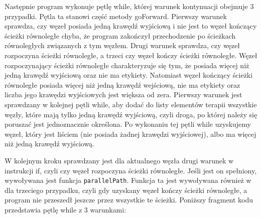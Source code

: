 Następnie program wykonuje pętlę while, której warunek kontynuacji obejmuje 3 przypadki. Pętla ta stanowi część metody goForward.
Pierwszy warunek sprawdza, czy węzeł posiada jedną krawędź wyjściową i nie jest to węzeł kończący ścieżki równoległe chyba, że program zakończył przechodzenie po ścieżkach równoległych związanych z tym węzłem. 
Drugi warunek sprawdza, czy węzeł rozpoczyna ścieżki równoległe, a trzeci czy węzeł kończy ścieżki równoległe. Węzeł rozpoczynający ścieżki równoległe charakteryzuje się tym, że posiada więcej niż jedną krawędź wyjściową oraz nie ma etykiety. Natomiast węzeł kończący ścieżki równoległe posiada więcej niż jedną krawędź wejściową, nie ma etykiety oraz liczba jego krawędzi wyjściowych jest większa od zera. 
Pierwszy warunek jest sprawdzany w kolejnej pętli while, aby dodać do listy elementów terapii wszystkie węzły, które mają tylko jedną krawędź wyjściową, czyli droga, po której należy się poruszać jest jednoznacznie określona. 
Po wykonaniu tej pętli while uzyskujemy węzeł, który jest liściem (nie posiada żadnej krawędzi wyjściowej), 
albo ma więcej niż jedną krawędź wyjściową.

W kolejnym kroku sprawdzany jest dla aktualnego węzła drugi warunek w instrukcji if, czyli czy węzeł rozpoczyna ścieżki równoległe. Jeśli jest on spełniony, wywoływana jest funkcja \texttt{parallelPath}. 
Funkcja ta jest wywoływana również w dla trzeciego przypadku, czyli gdy uzyskany węzeł kończy ścieżki równoległe, a program nie przeszedł jeszcze przez wszystkie te ścieżki. 
Poniższy fragment kodu przedstawia pętlę while z 3 warunkami:

